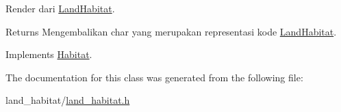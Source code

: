 Render dari \hyperlink{classLandHabitat}{Land\+Habitat}. 

\begin{DoxyReturn}{Returns}
Mengembalikan char yang merupakan representasi kode \hyperlink{classLandHabitat}{Land\+Habitat}. 
\end{DoxyReturn}


Implements \hyperlink{classHabitat_ad1bf10205d38e8e308eb9acc3aa2872c}{Habitat}.



The documentation for this class was generated from the following file\+:\begin{DoxyCompactItemize}
\item 
land\+\_\+habitat/\hyperlink{land__habitat_8h}{land\+\_\+habitat.\+h}\end{DoxyCompactItemize}
